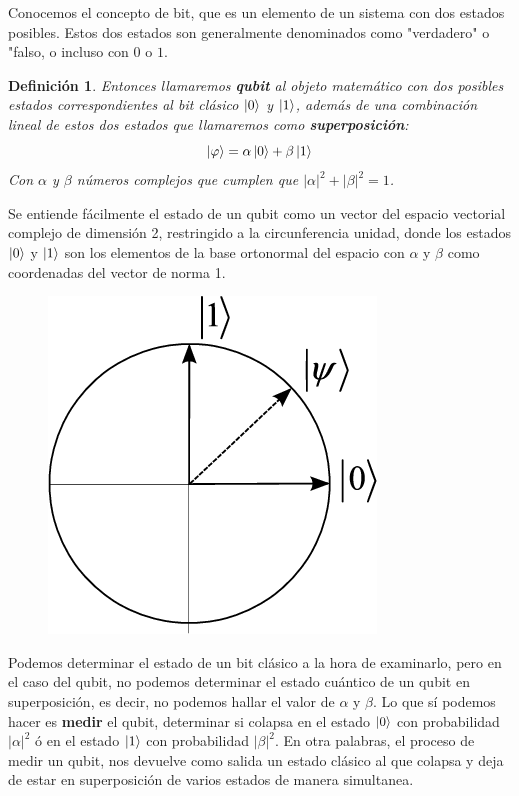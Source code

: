 \documentclass[a4paper]{article}
\newtheorem{deff}{Definición}[section]
\numberwithin{equation}{section}
\begin{document}
Conocemos el concepto de bit, que es un elemento de un sistema con dos estados posibles. Estos dos estados son generalmente denominados como "verdadero" o "falso, o incluso con $0$ o $1$.
\begin{deff}Entonces llamaremos \textbf{qubit} al objeto matemático con dos posibles estados correspondientes al bit clásico $\ket{0}$ y $\ket{1}$, además de una combinación lineal de estos dos estados que llamaremos como \textbf{superposición}:
\begin{equation}
\ket{\varphi} = \alpha\ket{0} + \beta\ket{1}
\end{equation}
Con $\alpha$ y $\beta$ números complejos que cumplen que $|\alpha|^2 + |\beta|^2 = 1$.
\end{deff}
Se entiende fácilmente el estado de un qubit como un vector del espacio vectorial complejo de dimensión 2, restringido a la circunferencia unidad, donde los estados $\ket{0}$ y $\ket{1}$ son los elementos de la base ortonormal del espacio con $\alpha$ y $\beta$ como coordenadas del vector de norma 1.
\begin{figure}[h]
	\centering
	\includegraphics[scale=.3]{qubit_vector}
\end{figure}

Podemos determinar el estado de un bit clásico a la hora de examinarlo, pero en el caso del qubit, no podemos determinar el estado cuántico de un qubit en superposición, es decir, no podemos hallar el valor de $\alpha$ y $\beta$. Lo que sí podemos hacer es \textbf{medir} el qubit, determinar si colapsa en el estado $\ket{0}$ con probabilidad $|\alpha|^2$ ó en el estado $\ket{1}$ con probabilidad $|\beta|^2$. En otra palabras, el proceso de medir un qubit, nos devuelve como salida un estado clásico al que colapsa y deja de estar en superposición de varios estados de manera simultanea.
\end{document}
